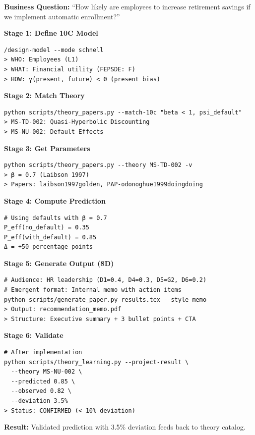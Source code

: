 \begin{tcolorbox}[colback=green!5!white, colframe=green!75!black,
    title=\textbf{Worked Example: Retirement Savings Intervention}]

\textbf{Business Question:} ``How likely are employees to increase retirement savings
if we implement automatic enrollment?''

\textbf{Stage 1: Define 10C Model}
\begin{verbatim}
/design-model --mode schnell
> WHO: Employees (L1)
> WHAT: Financial utility (FEPSDE: F)
> HOW: γ(present, future) < 0 (present bias)
\end{verbatim}

\textbf{Stage 2: Match Theory}
\begin{verbatim}
python scripts/theory_papers.py --match-10c "beta < 1, psi_default"
> MS-TD-002: Quasi-Hyperbolic Discounting
> MS-NU-002: Default Effects
\end{verbatim}

\textbf{Stage 3: Get Parameters}
\begin{verbatim}
python scripts/theory_papers.py --theory MS-TD-002 -v
> β = 0.7 (Laibson 1997)
> Papers: laibson1997golden, PAP-odonoghue1999doingdoing
\end{verbatim}

\textbf{Stage 4: Compute Prediction}
\begin{verbatim}
# Using defaults with β = 0.7
P_eff(no_default) = 0.35
P_eff(with_default) = 0.85
Δ = +50 percentage points
\end{verbatim}

\textbf{Stage 5: Generate Output (8D)}
\begin{verbatim}
# Audience: HR leadership (D1=0.4, D4=0.3, D5=G2, D6=0.2)
# Emergent format: Internal memo with action items
python scripts/generate_paper.py results.tex --style memo
> Output: recommendation_memo.pdf
> Structure: Executive summary + 3 bullet points + CTA
\end{verbatim}

\textbf{Stage 6: Validate}
\begin{verbatim}
# After implementation
python scripts/theory_learning.py --project-result \
  --theory MS-NU-002 \
  --predicted 0.85 \
  --observed 0.82 \
  --deviation 3.5%
> Status: CONFIRMED (< 10% deviation)
\end{verbatim}

\textbf{Result:} Validated prediction with 3.5\% deviation feeds back to theory catalog.

\end{tcolorbox}

